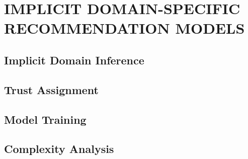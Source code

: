\section{IMPLICIT DOMAIN-SPECIFIC RECOMMENDATION MODELS}



\subsection{Implicit Domain Inference}

\subsection{Trust Assignment}

\subsection{Model Training}

\subsection{Complexity Analysis}